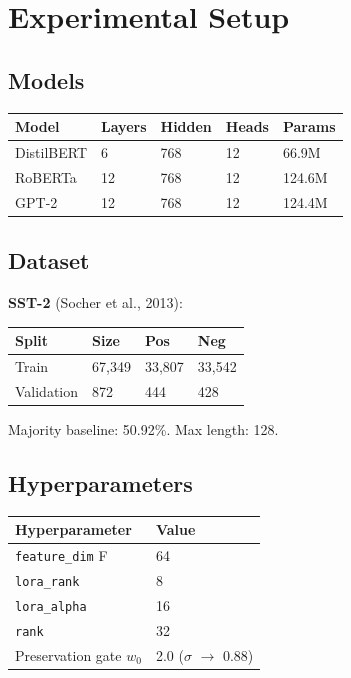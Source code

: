\section{Experimental Setup}

\subsection{Models}

\begin{table}[H]
\centering
\small
\begin{tabular}{lllll}
\toprule
\textbf{Model} & \textbf{Layers} & \textbf{Hidden} & \textbf{Heads} & \textbf{Params} \\
\midrule
DistilBERT & 6 & 768 & 12 & 66.9M \\
RoBERTa & 12 & 768 & 12 & 124.6M \\
GPT-2 & 12 & 768 & 12 & 124.4M \\
\bottomrule
\end{tabular}
\end{table}

\subsection{Dataset}

\textbf{SST-2} (Socher et al., 2013):

\begin{table}[H]
\centering
\small
\begin{tabular}{llll}
\toprule
\textbf{Split} & \textbf{Size} & \textbf{Pos} & \textbf{Neg} \\
\midrule
Train & 67,349 & 33,807 & 33,542 \\
Validation & 872 & 444 & 428 \\
\bottomrule
\end{tabular}
\end{table}

Majority baseline: 50.92\%. Max length: 128.

\subsection{Hyperparameters}

\begin{table}[H]
\centering
\small
\begin{tabular}{ll}
\toprule
\textbf{Hyperparameter} & \textbf{Value} \\
\midrule
\texttt{feature\_dim} F & 64 \\
\texttt{lora\_rank} & 8 \\
\texttt{lora\_alpha} & 16 \\
\texttt{rank} & 32 \\
Preservation gate $w_0$ & 2.0 ($\sigma$ $\to$ 0.88) \\
\bottomrule
\end{tabular}
\end{table}


